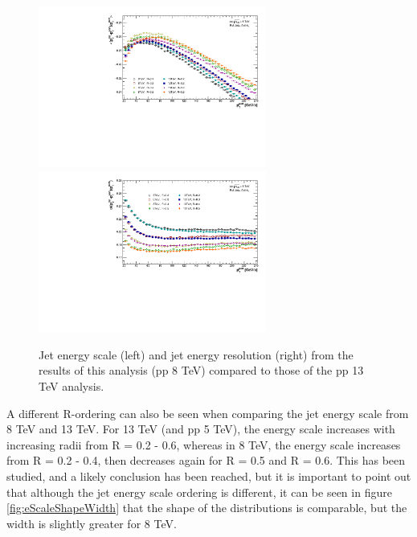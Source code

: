 \documentclass[ALICE]{ALICE_analysis_notes}
\newcommand{\pp}{pp\xspace}
\begin{document}
\begin{figure}[h!]
    \centering
    \begin{multicols}{2}
            \includegraphics[width=7.5cm]{figures/EnergyScale/EnergyScaleMean_Comparison.pdf}
        \vfill\null 
        \columnbreak
            \includegraphics[width=7.5cm]{figures/EnergyScale/EnergyScaleWidth_Comparison.pdf}
        \vfill\null
    \end{multicols}
    \caption{Jet energy scale (left) and jet energy resolution (right) from the results of this analysis (\pp 8 TeV) compared to those of the \pp 13 TeV analysis.}
    \label{fig:EnergyScaleComp}
\end{figure}

A different R-ordering can also be seen when comparing the jet energy scale from 8 TeV and 13 TeV. For 13 TeV (and \pp 5 TeV), the energy scale increases with increasing radii from R = 0.2 - 0.6, whereas in 8 TeV, the energy scale increases from R = 0.2 - 0.4, then decreases again for R = 0.5 and R = 0.6. This has been studied, and a likely conclusion has been reached, but it is important to point out that although the jet energy scale ordering is different, it can be seen in figure \ref{fig:eScaleShapeWidth} that the shape of the distributions is comparable, but the width is slightly greater for 8 TeV.
\end{document}
